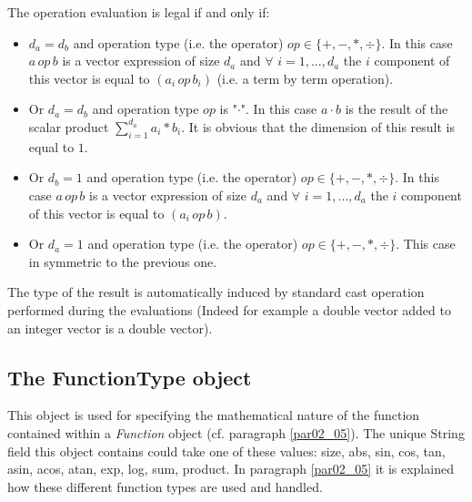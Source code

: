 \documentclass[a4paper,11pt] {ivoa}
\begin{document}
The operation evaluation is legal if and only if:
\begin{itemize}
\item $d_a=d_b$ and operation type (i.e. the operator) $op \in \{ + , - , \ast , \div \}$. In this
case $a \, op \, b$ is a vector expression of size $d_a$ and $\forall$ $i=1,...,d_a$ the $i$
component of this vector is equal to $(a_i \, op \,b_i)$ (i.e. a term by term operation).
\item Or $d_a = d_b$ and operation type $op$ is "$\cdot$". In this case $a \cdot b$ is the result of
the scalar product $\sum_{i =1}^{d_a} a_i \ast b_i$. It is obvious that the dimension of this result
is equal to $1$.
\item Or $d_b=1$ and operation type (i.e. the operator) $op \in \{ + , - , \ast , \div \}$. In this
case $a \, op \, b$ is a vector expression of size $d_a$ and $\forall$ $i=1,...,d_a$ the $i$
component of this vector is equal to $(a_i \, op \,b)$.
\item Or $d_a=1$ and operation type (i.e. the operator) $op \in \{ + , - , \ast , \div \}$. This
case in symmetric to the previous one.
\end{itemize}

The type of the result is automatically induced by standard cast operation performed during the
evaluations (Indeed for example a double vector added to an integer vector is a double vector).

\subsection{The FunctionType object}\label{par-FunctionType}
This object is used for specifying the mathematical nature of the function contained within a {\it
Function} object (cf. paragraph \ref{par02_05}). The unique String field this object contains could
take one of these values:
size, abs, sin, cos, tan, asin, acos, atan, exp, log, sum, product. In paragraph \ref{par02_05} it
is explained how these different function types are used and handled.
\end{document}
